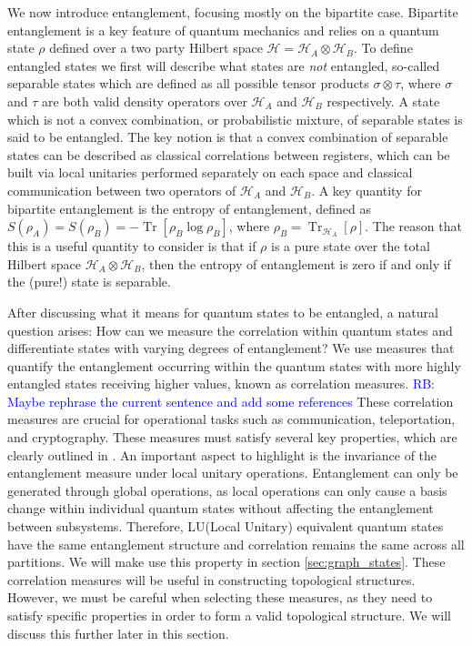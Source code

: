 \documentclass{article}
\newcommand{\rb}[1]{{\textcolor{blue}{RB: #1}}}
\DeclareMathOperator{\Tr}{Tr}
\newcommand{\brackets}[1]{\left[ #1 \right]}
\newcommand{\trace}[1]{\Tr \brackets{ #1 }}
\newcommand{\partrace}[2]{\Tr_{#1} \brackets{ #2 }}
\newcommand{\hilb}{\mathcal{H}}
\begin{document}
We now introduce entanglement, focusing mostly on the bipartite case. Bipartite entanglement is a key feature of quantum mechanics and relies on a quantum state $\rho$ defined over a two party Hilbert space $\hilb = \hilb_A \otimes \hilb_B$. To define entangled states we first will describe what states are \emph{not} entangled, so-called separable states which are defined as all possible tensor products $\sigma\otimes \tau$, where $\sigma$ and $\tau$ are both valid density operators over $\hilb_A$ and $\hilb_B$ respectively. A state which is not a convex combination, or probabilistic mixture, of separable states is said to be entangled. The key notion is that a convex combination of separable states can be described as classical correlations between registers, which can be built via local unitaries performed separately on each space and classical communication between two operators of $\hilb_A$ and $\hilb_B$. A key quantity for bipartite entanglement is the entropy of entanglement, defined as $S(\rho_A) = S(\rho_B) = -\trace{\rho_B \log \rho_B}$, where $\rho_B = \partrace{\hilb_A}{\rho}$. The reason that this is a useful quantity to consider is that if $\rho$ is a pure state over the total Hilbert space $\hilb_A \otimes \hilb_B$, then the entropy of entanglement is zero if and only if the (pure!) state is separable.

After discussing what it means for quantum states to be entangled, a natural question arises: How can we measure the correlation within quantum states and differentiate states with varying degrees of entanglement?
We use measures that quantify the entanglement occurring within the quantum states with more highly entangled states receiving higher values, known as correlation measures. \rb{Maybe rephrase the current sentence and add some references} These correlation measures are crucial for operational tasks such as communication, teleportation, and cryptography. These measures must satisfy several key properties, which are clearly outlined in \cite{guhne2009entanglement}. An important aspect to highlight is the invariance of the entanglement measure under local unitary operations. Entanglement can only be generated through global operations, as local operations can only cause a basis change within individual quantum states without affecting the entanglement between subsystems. Therefore, LU(Local Unitary) equivalent quantum states have the same entanglement structure and correlation remains the same across all partitions. We will make use this property in section \ref{sec:graph_states}. These correlation measures will be useful in constructing topological structures. However, we must be careful when selecting these measures, as they need to satisfy specific properties in order to form a valid topological structure. We will discuss this further later in this section.
\end{document}
